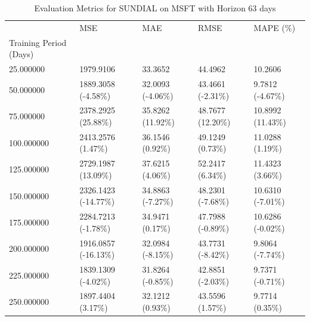 \begin{table}
\caption{Evaluation Metrics for SUNDIAL on MSFT with Horizon 63 days}
\label{tab:sundial_MSFT_h63_metrics}
\begin{tabular}{lllll}
\toprule
 & MSE & MAE & RMSE & MAPE (\%) \\
Training Period (Days) &  &  &  &  \\
\midrule
25.000000 & 1979.9106 & 33.3652 & 44.4962 & 10.2606 \\
50.000000 & 1889.3058 (-4.58\%) & 32.0093 (-4.06\%) & 43.4661 (-2.31\%) & 9.7812 (-4.67\%) \\
75.000000 & 2378.2925 (25.88\%) & 35.8262 (11.92\%) & 48.7677 (12.20\%) & 10.8992 (11.43\%) \\
100.000000 & 2413.2576 (1.47\%) & 36.1546 (0.92\%) & 49.1249 (0.73\%) & 11.0288 (1.19\%) \\
125.000000 & 2729.1987 (13.09\%) & 37.6215 (4.06\%) & 52.2417 (6.34\%) & 11.4323 (3.66\%) \\
150.000000 & 2326.1423 (-14.77\%) & 34.8863 (-7.27\%) & 48.2301 (-7.68\%) & 10.6310 (-7.01\%) \\
175.000000 & 2284.7213 (-1.78\%) & 34.9471 (0.17\%) & 47.7988 (-0.89\%) & 10.6286 (-0.02\%) \\
200.000000 & 1916.0857 (-16.13\%) & 32.0984 (-8.15\%) & 43.7731 (-8.42\%) & 9.8064 (-7.74\%) \\
225.000000 & 1839.1309 (-4.02\%) & 31.8264 (-0.85\%) & 42.8851 (-2.03\%) & 9.7371 (-0.71\%) \\
250.000000 & 1897.4404 (3.17\%) & 32.1212 (0.93\%) & 43.5596 (1.57\%) & 9.7714 (0.35\%) \\
\bottomrule
\end{tabular}
\end{table}
